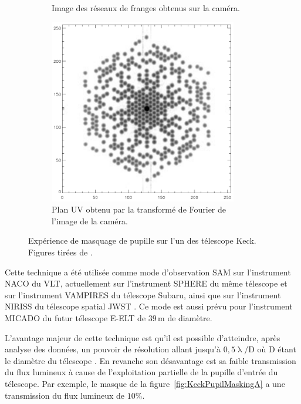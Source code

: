 \begin{figure}[ht!]
\begin{subfigure}[t]{0.31\textwidth}
        \caption{Image des réseaux de franges obtenus sur la caméra.}
        \label{fig:KeckPupilMaskingB}
    \end{subfigure}\hspace{0.01\textwidth}
    \begin{subfigure}[t]{0.31\textwidth}
        \centering
        \includegraphics[width=0.9\textwidth]{Figure_Chap1/Tuthill2000_Figure3c.png}
        \caption{Plan UV obtenu par la transformé de Fourier de l'image de la caméra.}
        \label{fig:KeckPupilMaskingC}
    \end{subfigure}
    \caption[Expérience de masquage de pupille sur l'un des télescope Keck.]{Expérience de masquage de pupille sur l'un des télescope Keck. Figures tirées de \cite{tuthill2000}.}
    \label{fig:KeckPupilMasking}
\end{figure}

Cette technique a été utilisée comme mode d'observation \ac{SAM} sur l'instrument \ac{NACO} \citep{tuthill2010, lacour2011a} du \ac{VLT}, actuellement sur l'instrument \ac{SPHERE} \citep{cheetham2016} du même télescope et sur l'instrument \ac{VAMPIRES} \citep{norris2015} du télescope Subaru, ainsi que sur l'instrument \ac{NIRISS} du télescope spatial \ac{JWST} \citep{sivaramakrishnan2012}. Ce mode est aussi prévu pour l'instrument \ac{MICADO} \citep{lacour2014} du futur télescope \ac{E-ELT} de $39 \,$m de diamètre.

L'avantage majeur de cette technique est qu'il est possible d'atteindre, après analyse des données, un pouvoir de résolution allant jusqu'à $0,5 \uplambda / \text{D}$ où D étant le diamètre du télescope \citep{lacour2011b}. En revanche son désavantage est sa faible transmission du flux lumineux à cause de l'exploitation partielle de la pupille d'entrée du télescope. Par exemple, le masque de la figure~\ref{fig:KeckPupilMaskingA} a une transmission du flux lumineux de $10\%$.

